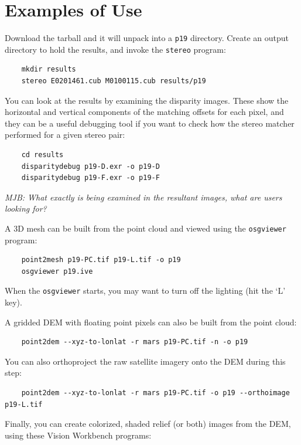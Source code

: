 \section{Examples of Use}


Download the tarball and it will unpack into a \texttt{p19} directory.  Create an output directory to hold the results, and invoke the \texttt{stereo} program:

\begin{verbatim}
	mkdir results
	stereo E0201461.cub M0100115.cub results/p19
\end{verbatim}

You can look at the results by examining the disparity images. These
show the horizontal and vertical components of the matching offsets
for each pixel, and they can be a useful debugging tool if you want
to check how the stereo matcher performed for a given stereo pair:

\begin{verbatim}
	cd results
	disparitydebug p19-D.exr -o p19-D     
	disparitydebug p19-F.exr -o p19-F
\end{verbatim}

\emph{MJB: What exactly is being examined in the resultant images, what are users looking for?}

A 3D mesh can be built from the point cloud and viewed using the
\texttt{osgviewer} program:

\begin{verbatim}
	point2mesh p19-PC.tif p19-L.tif -o p19
	osgviewer p19.ive
\end{verbatim}

When the \texttt{osgviewer} starts, you may want to turn off the
lighting (hit the `L' key).

A gridded DEM with floating point pixels can also be built from the point cloud:

\begin{verbatim}
	point2dem --xyz-to-lonlat -r mars p19-PC.tif -n -o p19
\end{verbatim}

You can also orthoproject the raw satellite imagery onto the DEM during this step:

\begin{verbatim}
	point2dem --xyz-to-lonlat -r mars p19-PC.tif -o p19 --orthoimage p19-L.tif
\end{verbatim}

Finally, you can create colorized, shaded relief (or both) images from the DEM, using these Vision Workbench programs:

